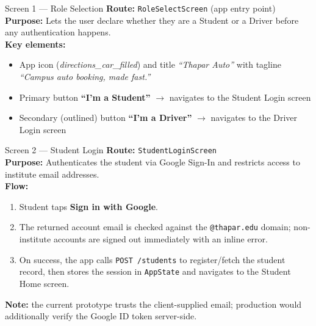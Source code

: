 \documentclass[11pt,a4paper]{article}
\begin{document}
\begin{screenbox}{Screen 1 --- Role Selection}
\textbf{Route:} \texttt{RoleSelectScreen} (app entry point) \\[4pt]
\textbf{Purpose:} Lets the user declare whether they are a Student or a Driver before
any authentication happens. \\[4pt]
\textbf{Key elements:}
\begin{itemize}[leftmargin=*, itemsep=1pt]
  \item App icon (\emph{directions\_car\_filled}) and title \textit{``Thapar Auto''}
        with tagline \textit{``Campus auto booking, made fast.''}
  \item Primary button \textbf{``I'm a Student''} $\rightarrow$ navigates to the
        Student Login screen
  \item Secondary (outlined) button \textbf{``I'm a Driver''} $\rightarrow$ navigates
        to the Driver Login screen
\end{itemize}
\end{screenbox}

\begin{screenbox}{Screen 2 --- Student Login}
\textbf{Route:} \texttt{StudentLoginScreen} \\[4pt]
\textbf{Purpose:} Authenticates the student via Google Sign-In and restricts access to
institute email addresses. \\[4pt]
\textbf{Flow:}
\begin{enumerate}[leftmargin=*, itemsep=1pt]
  \item Student taps \textbf{Sign in with Google}.
  \item The returned account email is checked against the \texttt{@thapar.edu} domain;
        non-institute accounts are signed out immediately with an inline error.
  \item On success, the app calls \texttt{POST /students} to register/fetch the
        student record, then stores the session in \texttt{AppState} and navigates to
        the Student Home screen.
\end{enumerate}
\textbf{Note:} the current prototype trusts the client-supplied email; production
would additionally verify the Google ID token server-side.
\end{screenbox}
\end{document}
